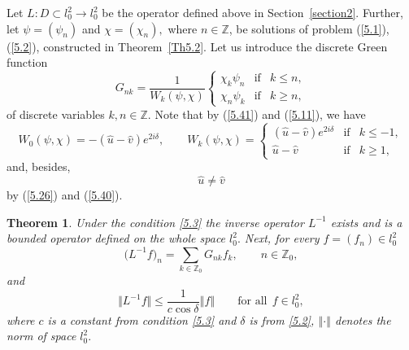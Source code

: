 \documentclass[11pt]{article}
\newtheorem{theorem}{Theorem}
\numberwithin{equation}{section}
\begin{document}
Let $L:D\subset l_{0}^{2}\rightarrow l_{0}^{2}$ be the operator def\/ined
above in Section~\ref{section2}. Further, let $\psi =(\psi _{n})$ and $\chi
=(\chi _{n}),$ where $n\in
\mathbb{Z}
$, be solutions of problem (\ref{5.1}), (\ref{5.2}), constructed in Theorem~\ref{Th5.2}. Let us introduce the discrete Green function%
\begin{equation*}
G_{nk}=\frac{1}{W_{k}(\psi ,\chi )}\left\{
\begin{array}{lll}
\chi _{k}\psi _{n} & \text{if} & k\leq n, \\
\chi _{n}\psi _{k} & \text{if} & k\geq n,%
\end{array}%
\right. %
\end{equation*}%
of discrete variables $k,n\in
\mathbb{Z}
.$ Note that by (\ref{5.41}) and (\ref{5.11}), we have%
\begin{equation}
W_{0}(\psi ,\chi )=-(\widehat{u}-\widehat{v})e^{2i\delta },\qquad
W_{k}(\psi ,\chi )=\left\{
\begin{array}{lll}
(\widehat{u}-\widehat{v})e^{2i\delta } & \text{if} & k\leq -1, \\
\widehat{u}-\widehat{v} & \text{if} & k\geq 1,%
\end{array}%
\right.  \label{6.6}
\end{equation}%
and, besides,%
\begin{equation*}
\widehat{u}\neq \widehat{v}  %
\end{equation*}%
by (\ref{5.26}) and (\ref{5.40}).

\begin{theorem}
\label{Th6.1}Under the condition \eqref{5.3} the inverse operator $L^{-1}$
exists and is a bounded operator defined on the whole space $l_{0}^{2}.$
Next, for every $f=(f_{n})\in l_{0}^{2}$%
\begin{equation}
\big(L^{-1}f\big)_{n}=\sum_{k\in
\mathbb{Z}
_{0}}G_{nk}f_{k},\qquad n\in \mathbb{Z}
_{0},  \label{6.8}
\end{equation}%
and%
\begin{equation}
\big\Vert L^{-1}f\big\Vert \leq \frac{1}{c\cos \delta }\left\Vert
f\right\Vert \qquad \text{for all} \ \ f\in l_{0}^{2},  \label{6.9}
\end{equation}%
where $c$ is a constant from condition \eqref{5.3} and $\delta $ is from \eqref{5.2}, $\left\Vert \cdot \right\Vert $ denotes the norm of space $l_{0}^{2}.$
\end{theorem}
\end{document}
